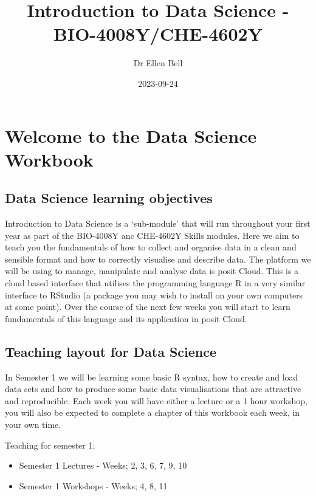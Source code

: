 \documentclass[
]{book}
\title{Introduction to Data Science - BIO-4008Y/CHE-4602Y}
\author{Dr Ellen Bell}
\date{2023-09-24}
\providecommand{\tightlist}{%
  \setlength{\itemsep}{0pt}\setlength{\parskip}{0pt}}
\begin{document}
\maketitle

{
\setcounter{tocdepth}{1}
\tableofcontents
}
\hypertarget{welcome-to-the-data-science-workbook}{%
\chapter{Welcome to the Data Science Workbook}\label{welcome-to-the-data-science-workbook}}

\hypertarget{data-science-learning-objectives}{%
\section{Data Science learning objectives}\label{data-science-learning-objectives}}

Introduction to Data Science is a `sub-module' that will run throughout your first year as part of the BIO-4008Y anc CHE-4602Y Skills modules. Here we aim to teach you the fundamentals of how to collect and organise data in a clean and sensible format and how to correctly visualise and describe data. The platform we will be using to manage, manipulate and analyse data is posit Cloud. This is a cloud based interface that utilises the programming language R in a very similar interface to RStudio (a package you may wish to install on your own computers at some point). Over the course of the next few weeks you will start to learn fundamentals of this language and its application in posit Cloud.

\hypertarget{teaching-layout-for-data-science}{%
\section{Teaching layout for Data Science}\label{teaching-layout-for-data-science}}

In Semester 1 we will be learning some basic R syntax, how to create and load data sets and how to produce some basic data visualisations that are attractive and reproducible. Each week you will have either a lecture or a 1 hour workshop, you will also be expected to complete a chapter of this workbook each week, in your own time.

Teaching for semester 1;

\begin{itemize}
\tightlist
\item
  Semester 1 Lectures - Weeks; 2, 3, 6, 7, 9, 10
\item
  Semester 1 Workshops - Weeks; 4, 8, 11
\end{itemize}
\end{document}
